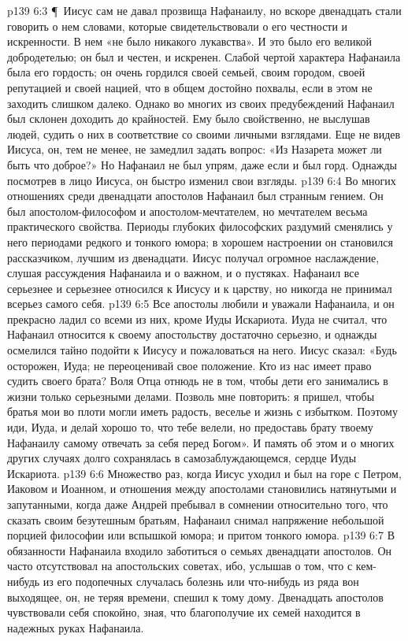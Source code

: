 \vs p139 6:3 \P\ Иисус сам не давал прозвища Нафанаилу, но вскоре двенадцать стали говорить о нем словами, которые свидетельствовали о его честности и искренности. В нем «не было никакого лукавства». И это было его великой добродетелью; он был и честен, и искренен. Слабой чертой характера Нафанаила была его гордость; он очень гордился своей семьей, своим городом, своей репутацией и своей нацией, что в общем достойно похвалы, если в этом не заходить слишком далеко. Однако во многих из своих предубеждений Нафанаил был склонен доходить до крайностей. Ему было свойственно, не выслушав людей, судить о них в соответствие со своими личными взглядами. Еще не видев Иисуса, он, тем не менее, не замедлил задать вопрос: «Из Назарета может ли быть что доброе?» Но Нафанаил не был упрям, даже если и был горд. Однажды посмотрев в лицо Иисуса, он быстро изменил свои взгляды.
\vs p139 6:4 Во многих отношениях среди двенадцати апостолов Нафанаил был странным гением. Он был апостолом\hyp{}философом и апостолом\hyp{}мечтателем, но мечтателем весьма практического свойства. Периоды глубоких философских раздумий сменялись у него периодами редкого и тонкого юмора; в хорошем настроении он становился рассказчиком, лучшим из двенадцати. Иисус получал огромное наслаждение, слушая рассуждения Нафанаила и о важном, и о пустяках. Нафанаил все серьезнее и серьезнее относился к Иисусу и к царству, но никогда не принимал всерьез самого себя.
\vs p139 6:5 Все апостолы любили и уважали Нафанаила, и он прекрасно ладил со всеми из них, кроме Иуды Искариота. Иуда не считал, что Нафанаил относится к своему апостольству достаточно серьезно, и однажды осмелился тайно подойти к Иисусу и пожаловаться на него. Иисус сказал: «Будь осторожен, Иуда; не переоценивай свое положение. Кто из нас имеет право судить своего брата? Воля Отца отнюдь не в том, чтобы дети его занимались в жизни только серьезными делами. Позволь мне повторить: я пришел, чтобы братья мои во плоти могли иметь радость, веселье и жизнь с избытком. Поэтому иди, Иуда, и делай хорошо то, что тебе велели, но предоставь брату твоему Нафанаилу самому отвечать за себя перед Богом». И память об этом и о многих других случаях долго сохранялась в самозаблуждающемся, сердце Иуды Искариота.
\vs p139 6:6 Множество раз, когда Иисус уходил и был на горе с Петром, Иаковом и Иоанном, и отношения между апостолами становились натянутыми и запутанными, когда даже Андрей пребывал в сомнении относительно того, что сказать своим безутешным братьям, Нафанаил снимал напряжение небольшой порцией философии или вспышкой юмора; и притом тонкого юмора.
\vs p139 6:7 В обязанности Нафанаила входило заботиться о семьях двенадцати апостолов. Он часто отсутствовал на апостольских советах, ибо, услышав о том, что с кем\hyp{}нибудь из его подопечных случалась болезнь или что\hyp{}нибудь из ряда вон выходящее, он, не теряя времени, спешил к тому дому. Двенадцать апостолов чувствовали себя спокойно, зная, что благополучие их семей находится в надежных руках Нафанаила.
